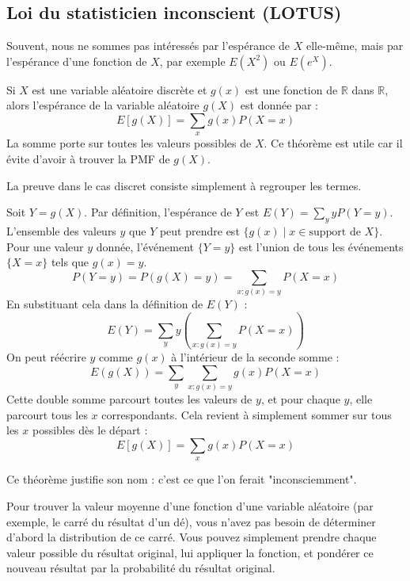 \subsection{Loi du statisticien inconscient (LOTUS)}

Souvent, nous ne sommes pas intéressés par l'espérance de $X$ elle-même, mais par l'espérance d'une fonction de $X$, par exemple $E(X^2)$ ou $E(e^X)$.

\begin{theorembox}
Si $X$ est une variable aléatoire discrète et $g(x)$ est une fonction de $\mathbb{R}$ dans $\mathbb{R}$, alors l'espérance de la variable aléatoire $g(X)$ est donnée par :
$$ E[g(X)] = \sum_x g(x) P(X=x) $$
La somme porte sur toutes les valeurs possibles de $X$. Ce théorème est utile car il évite d'avoir à trouver la PMF de $g(X)$.
\end{theorembox}

La preuve dans le cas discret consiste simplement à regrouper les termes.

\begin{proofbox}
Soit $Y = g(X)$. Par définition, l'espérance de $Y$ est $E(Y) = \sum_y y P(Y=y)$.
L'ensemble des valeurs $y$ que $Y$ peut prendre est $\{g(x) \mid x \in \text{support de } X\}$.
Pour une valeur $y$ donnée, l'événement $\{Y=y\}$ est l'union de tous les événements $\{X=x\}$ tels que $g(x)=y$.
$$ P(Y=y) = P(g(X)=y) = \sum_{x: g(x)=y} P(X=x) $$
En substituant cela dans la définition de $E(Y)$ :
$$ E(Y) = \sum_y y \left( \sum_{x: g(x)=y} P(X=x) \right) $$
On peut réécrire $y$ comme $g(x)$ à l'intérieur de la seconde somme :
$$ E(g(X)) = \sum_y \sum_{x: g(x)=y} g(x) P(X=x) $$
Cette double somme parcourt toutes les valeurs de $y$, et pour chaque $y$, elle parcourt tous les $x$ correspondants. Cela revient à simplement sommer sur tous les $x$ possibles dès le départ :
$$ E[g(X)] = \sum_x g(x) P(X=x) $$
\end{proofbox}

Ce théorème justifie son nom : c'est ce que l'on ferait "inconsciemment".

\begin{intuitionbox}
Pour trouver la valeur moyenne d'une fonction d'une variable aléatoire (par exemple, le carré du résultat d'un dé), vous n'avez pas besoin de déterminer d'abord la distribution de ce carré. Vous pouvez simplement prendre chaque valeur possible du résultat original, lui appliquer la fonction, et pondérer ce nouveau résultat par la probabilité du résultat original.
\end{intuitionbox}

